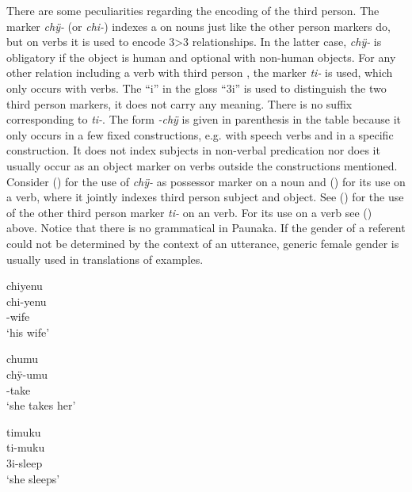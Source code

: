 There are some peculiarities regarding the encoding of the third person. The marker \textit{chÿ-} (or \textit{chi-}) indexes a  on nouns just like the other person markers do, but on verbs it is used to encode 3>3 relationships. In the latter case, \textit{chÿ-} is obligatory if the object  is human and optional with non-human objects. For any other relation including a verb with third person , the marker \textit{ti-} is used, which only occurs with verbs. The “i” in the gloss “3i” is used to distinguish the two third person markers, it does not carry any meaning. There is no suffix corresponding to \textit{ti-}. The form \textit{-chÿ} is given in parenthesis in the table because it only occurs in a few fixed constructions, e.g. with speech verbs and in a specific  construction. It does not index subjects in non-verbal predication nor does it usually occur as an object marker on verbs outside the constructions mentioned. Consider () for the use of \textit{chÿ-} as possessor marker on a noun and () for its use on a verb, where it jointly indexes third person subject and object. See () for the use of the other third person marker \textit{ti-} on an  verb. For its use on a  verb see () above. Notice that there is no grammatical  in Paunaka. If the gender of a referent could not be determined by the context of an utterance, generic female gender is usually used in translations of examples.

\ea\label{ex:Sketch-3-N}
\begingl
\glpreamble chiyenu\\
\gla chi-yenu\\
-wife\\
\glft ‘his wife’\\
\endgl
\xe

\ea\label{ex:Sketch-3-V}
\begingl
\glpreamble chumu\\
\gla chÿ-umu\\
-take\\
\glft ‘she takes her’\\
\endgl
\xe

\ea\label{ex:Sketch-3i-V}
\begingl
\glpreamble timuku\\
\gla ti-muku\\
\glb 3i-sleep\\
\glft ‘she sleeps’\\
\endgl
\xe
{}

